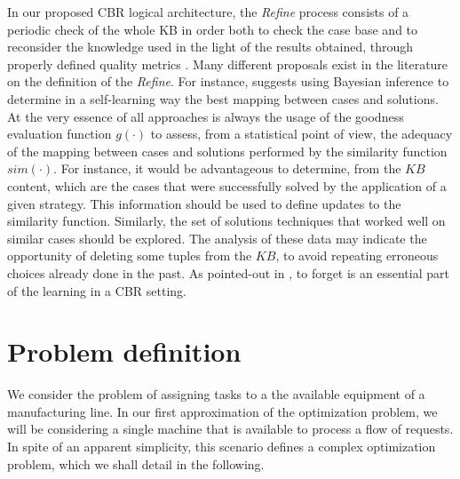 \documentclass{IEEEtran}
\begin{document}
In our proposed CBR logical architecture, the {\em Refine} process consists of a periodic check of the whole KB in order both to check the case base and to reconsider the knowledge used in the light of the results obtained, through properly defined quality metrics \cite{Reinartz2000}. 
Many different proposals exist in the literature on the definition of  the 
{\em Refine}. For instance, \cite{Tirri1996} suggests using Bayesian inference to determine  in a self-learning way the best mapping between cases and solutions. 
At the very essence of all approaches is always the usage of  the goodness evaluation function $g(\cdot)$  to assess, from a statistical point of view, the adequacy of the mapping between cases and solutions performed by the similarity function $sim(\cdot)$. 
For instance, it would be advantageous to determine, from the $KB$ content, which are the cases that were successfully solved by the application of a given strategy. This information should be used  to define updates to the similarity function. Similarly, the set of solutions techniques that worked well on similar cases should be explored. The analysis of these data may indicate the opportunity of deleting some tuples from the $KB$, to avoid repeating erroneous choices already done in the past.   
As pointed-out in \cite{Smyth1995}, to forget is an essential part of the learning in a CBR setting.  

\section{Problem definition} 
\label{prob}
We consider the problem of assigning tasks to a the available equipment of a manufacturing line. In our first approximation of the optimization problem, we will be considering a single machine that is available to process a flow of requests. 
In spite of an apparent simplicity, this scenario defines a complex optimization problem, which we shall detail in the following. 
\end{document}
